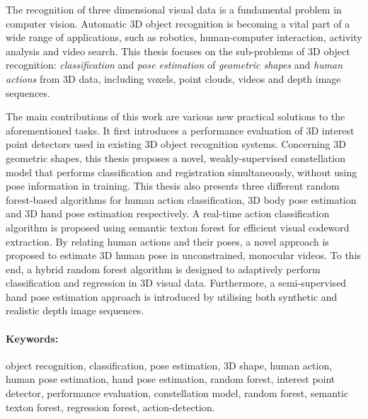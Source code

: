 The recognition of three dimensional visual data is a fundamental problem in computer vision. 
Automatic 3D object recognition is becoming a vital part of a wide range of applications, such as robotics, human-computer interaction, activity analysis and video search. This thesis focuses on the sub-problems of 3D object recognition: \emph{classification} and \emph{pose estimation} of \emph{geometric shapes} and \emph{human actions} from 3D data, including voxels, point clouds, videos and depth image sequences.  

The main contributions of this work are various new practical solutions to the aforementioned tasks. 
It first introduces a performance evaluation of 3D interest point detectors used in existing 3D object recognition systems.  
Concerning 3D geometric shapes, this thesis proposes a novel, weakly-supervised constellation model that performs classification and registration simultaneously, without using pose information in training. This thesis also presents three different random forest-based algorithms for human action classification, 3D body pose estimation and 3D hand pose estimation respectively. 
A real-time action classification algorithm is proposed using semantic texton forest for efficient visual codeword extraction. By relating human actions and their poses, a novel approach is proposed to estimate 3D human pose in unconstrained, monocular videos. To this end, a hybrid random forest algorithm is designed to adaptively perform classification and regression in 3D visual data.   
Furthermore, a semi-supervised hand pose estimation approach is introduced by utilising both synthetic and realistic depth image sequences. 

\paragraph{Keywords:~} object recognition, classification, pose estimation, 3D shape, human action, human pose estimation, hand pose estimation, random forest, interest point detector, performance evaluation, constellation model, random forest, semantic texton forest, regression forest, action-detection. 
